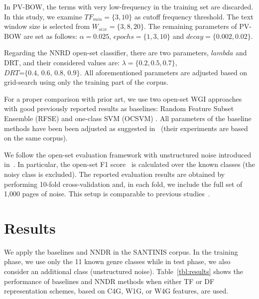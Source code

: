 \documentclass[runningheads]{llncs}
\begin{document}
In PV-BOW, the terms with very low-frequency in the training set are discarded. In this study, we examine $TF_{min}=\{3,10\}$ as cutoff frequency threshold. The text window size is selected from $W_{size}=\{3,8,20\}$. The remaining parameters of PV-BOW are set as follows: $\alpha=0.025$, $epochs=\{1, 3, 10\}$ and $decay=\{0.002, 0.02\}$.

Regarding the NNRD open-set classifier, there are two parameters, $lambda$ and DRT, and their considered values are: $\lambda =\{0.2, 0.5, 0.7\}$, $DRT\textit{=\{0.4, 0.6, 0.8, 0.9\}}$. All aforementioned parameters are adjusted based on grid-search using only the training part of the corpus.

For a proper comparison with prior art, we use two open-set WGI approaches with good previously reported results as baselines: Random Feature Subset Ensemble (RFSE) and one-class SVM (OCSVM) \cite{pritsos2013open,pritsos2018open}. All parameters of the baseline methods have been been adjusted as suggested in~\cite{pritsos2018open} (their experiments are based on the same corpus).

We follow the open-set evaluation framework with unstructured noise introduced in~\cite{pritsos2018open}. In particular, the open-set F1 score~\cite{mendesjunior2016} is calculated over the known classes (the noisy class is excluded). The reported evaluation results are obtained by performing 10-fold cross-validation and, in each fold, we include the full set of 1,000 pages of noise. This setup is comparable to previous studies~\cite{pritsos2018open}.

\section{Results}\label{sec:Experiments_Results}

We apply the baselines and NNDR in the SANTINIS corpus. In the training phase, we use only the 11 known genre classes while in test phase, we also consider an additional class (unstructured noise). Table~\ref{tbl:results} shows the performance of baselines and NNDR methods when either TF or DF representation schemes, based on C4G, W1G, or W4G features, are used. 
\end{document}
